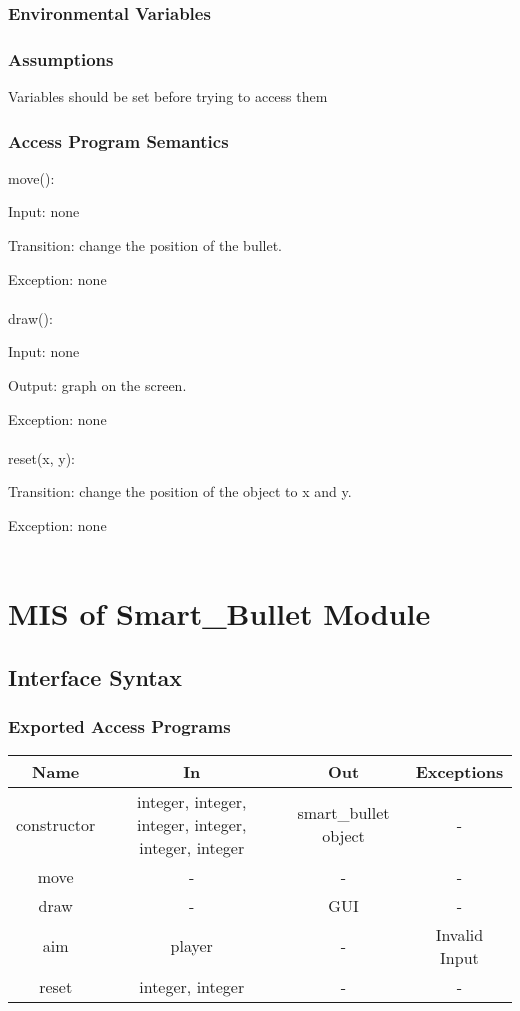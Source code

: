 \documentclass[12,english]{article}
\begin{document}
		\subsubsection{Environmental Variables}
		
		\subsubsection{Assumptions}
		Variables should be set before trying to access them
		
		\subsubsection{Access Program Semantics}
		
		move():
		
		Input: none
		
		Transition: change the position of the bullet.
		
		Exception: none\\ 
		\\
		draw():
		
		Input: none
		
		Output: graph on the screen.
		
		Exception: none\\ 
		\\
		reset(x, y):
		
		Transition: change the position of the object to x and y.
		
		Exception: none\\ 
		\\
	
	
	
\section{MIS of Smart\_Bullet Module}
	\subsection{Interface Syntax}
		\subsubsection{Exported Access Programs}
		\begin{table}[!htbp]
		\begin{tabular}{|c|c|c|c|}
			\hline
			Name & In & Out & Exceptions \\ \hline
			constructor & integer, integer, integer, integer, integer, integer & smart\_bullet object & - \\ \hline
			move & - & - & - \\ \hline
			draw & - & GUI & - \\ \hline
			aim & player & - & Invalid Input \\ \hline
			reset & integer, integer &  - & - \\ \hline
		\end{tabular}
	\end{table}
		
\end{document}
